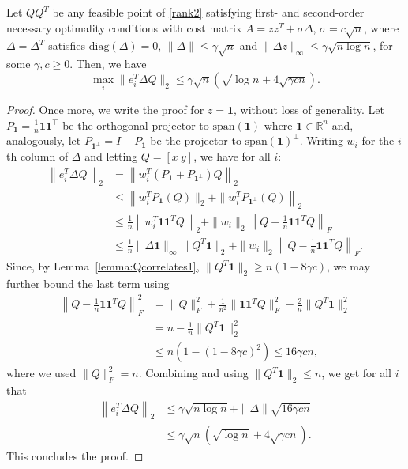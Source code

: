 \documentclass{colt2016} %
\newcommand{\transpose}{^\top\! }
\newcommand{\Rn}{{\mathbb{R}^n}}
\newcommand{\diag}{\mathrm{diag}}
\newcommand{\1}{\mathbf{1}}
\begin{document}
\begin{lemma}\label{lem:maxrowWY2}
	Let $QQ^T$ be any feasible point of \eqref{rank2} satisfying first- and second-order necessary optimality conditions with cost matrix $A = zz^T + \sigma \Delta $, $\sigma = c\sqrt{n}$, where $\Delta  = \Delta^T$ satisfies $\diag(\Delta ) = 0$, $\|\Delta \| \leq \gamma \sqrt{n}$ and $\|\Delta z\|_\infty \leq \gamma \sqrt{n \log n}$, for some $\gamma, c \geq 0$. Then, we have
	$$
	\max_i \|e_i^T\Delta Q\|_2 \leq \gamma \sqrt{n} \left( \sqrt{\log n}  + 4\sqrt{\gamma cn}\right).
	$$
\end{lemma}
\begin{proof}
	Once more, we write the proof for $z=\1$, without loss of generality.
	Let $P_\1 = \frac{1}{n} \1\1\transpose$ be the orthogonal projector to $\text{span}(\1)$ where $\1 \in\Rn$ and, analogously, let $P_{\1^\perp} = I-P_\1$ be the projector to $\text{span}(\1)^\perp$. Writing $w_i$ for the $i$th column of $\Delta$ and letting $Q = [x\ y]$, we have for all $i$:
	\begin{align*}
	\left\|e_i^T \Delta  Q \right\|_2 &= \left\| w_i^T (P_{\1} + P_{\1^\perp})Q\right\|_2\\
	&\leq \left\|w_i^T P_\1 (Q) \|_2 + \|w_i^T P_{\1^\perp} (Q) \right\|_2\\
	& \leq \frac{1}{n}\left\| w_i^T \1\1^TQ \right\|_2 + \|w_i\|_2 \left\| Q - \frac{1}{n} \1\1^TQ \right\|_F \\
	& \leq \frac{1}{n} \|\Delta \1\|_\infty \|Q^T \1\|_2 + \|w_i\|_2 \left\| Q - \frac{1}{n} \1\1^TQ \right\|_F.
	\end{align*}
	Since,
	by Lemma~\ref{lemma:Qcorrelates1},
	$\|Q^T \1\|_2 \geq n\left(1 - 8\gamma c\right)$, we may further bound the last term using
	\begin{align*}
	\left\| Q - \frac{1}{n} \1\1^TQ \right\|_F^2 & = \|Q\|_F^2 + \frac{1}{n^2} \|\1 \1^TQ\|_F^2 - \frac{2}{n} \|Q^T \1\|_2^2 \\
	& = n - \frac{1}{n} \|Q^T \1\|_2^2 \\
	& \leq n ( 1 - (1-8\gamma c)^2) \leq 16\gamma c n,
	\end{align*}
	where we used $\|Q\|_F^2 = n$.
	Combining and using $\|Q^T\1\|_2 \leq n$, we get for all $i$ that
	\begin{align*}
	\left\|e_i^T \Delta  Q \right\|_2 & \leq \gamma \sqrt{n \log n} + \|\Delta \| \sqrt{16\gamma cn} \\
	& \leq \gamma \sqrt{n} \left( \sqrt{\log n}  + 4\sqrt{\gamma cn}\right).
	\end{align*}
	This concludes the proof.
\end{proof}
\end{document}
